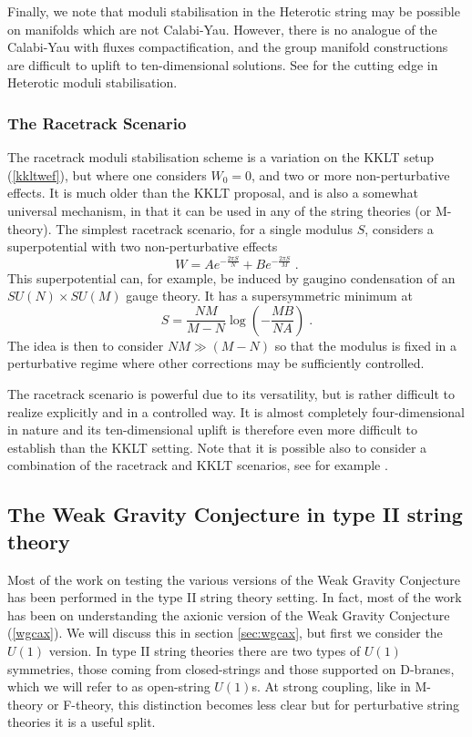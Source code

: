 \documentclass[11pt,a4paper]{article}
\numberwithin{equation}{section}
\numberwithin{table}{section}\setlength{\multlinegap}{25pt}
\newcommand{\be}{\begin{equation}}
\newcommand{\ee}{\end{equation}}
\begin{document}
Finally, we note that moduli stabilisation in the Heterotic string may be possible on manifolds which are not Calabi-Yau. However, there is no analogue of the Calabi-Yau with fluxes compactification, and the group manifold constructions are difficult to uplift to ten-dimensional solutions. See \cite{Lukas:2015kca,Klaput:2012vv,Anderson:2011cza} for the cutting edge in Heterotic moduli stabilisation. 

\subsubsection{The Racetrack Scenario}
\label{sec:reacetrack}

The racetrack moduli stabilisation scheme \cite{KRASNIKOV198737,Dixon:1990ds,raceross,Kaplunovsky:1997cy,deCarlos:1992kox} is a variation on the KKLT setup (\ref{kkltwef}), but where one considers $W_0=0$, and two or more non-perturbative effects. It is much older than the KKLT proposal, and is also a somewhat universal mechanism, in that it can be used in any of the string theories (or M-theory). The simplest racetrack scenario, for a single modulus $S$, considers a superpotential with two non-perturbative effects
\be
W = A e^{-\frac{2\pi S}{N}} + B e^{-\frac{2\pi S}{M}} \;.
\label{racetrackW}
\ee
This superpotential can, for example, be induced by gaugino condensation of an $SU(N)\times SU(M)$ gauge theory.
It has a supersymmetric minimum at
\be
S = \frac{N M}{M-N} \log \left( -\frac{M B}{N A} \right) \;.
\ee
The idea is then to consider $N M \gg \left(M-N\right)$ so that the modulus is fixed in a perturbative regime where other corrections may be sufficiently controlled. 

The racetrack scenario is powerful due to its versatility, but is rather difficult to realize explicitly and in a controlled way. It is almost completely four-dimensional in nature and its ten-dimensional uplift is therefore even more difficult to establish than the KKLT setting. Note that it is possible also to consider a combination of the racetrack and KKLT scenarios, see for example \cite{Kallosh:2004yh}.


\subsection{The Weak Gravity Conjecture in type II string theory}
\label{sec:wgciist}

Most of the work on testing the various versions of the Weak Gravity Conjecture has been performed in the type II string theory setting. In fact, most of the work has been on understanding the axionic version of the Weak Gravity Conjecture (\ref{wgcax}). We will discuss this in section \ref{sec:wgcax}, but first we consider the $U(1)$ version. In type II string theories there are two types of $U(1)$ symmetries, those coming from closed-strings and those supported on D-branes, which we will refer to as open-string $U(1)$s. At strong coupling, like in M-theory or F-theory, this distinction becomes less clear but for perturbative string theories it is a useful split. 
\end{document}
